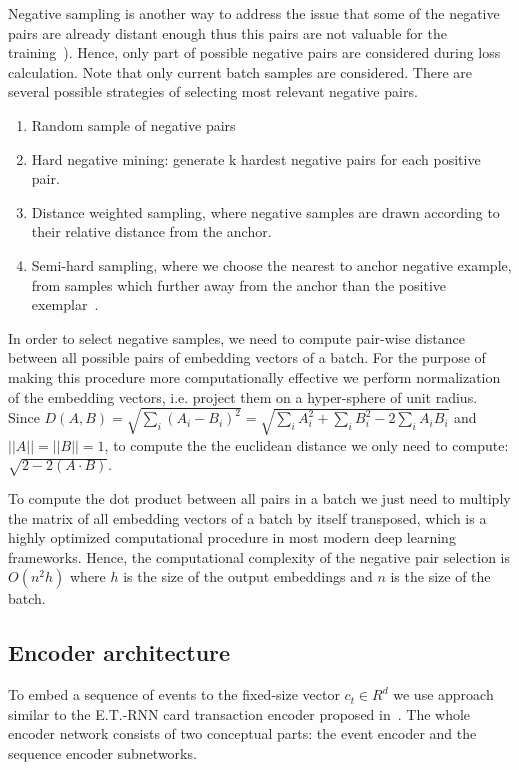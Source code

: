 \documentclass{article}
\begin{document}
Negative sampling is another way to address the issue that some of the negative pairs are already distant enough thus this pairs are not valuable for the training~\cite{SimoSerra2015DiscriminativeLO, Manmatha2017SamplingMI, Schroff2015FaceNetAU}). Hence, only part of possible negative pairs are considered during loss calculation. Note that only current batch samples are considered. There are several possible strategies of selecting most relevant negative pairs.

\begin{enumerate}
    \item Random sample of negative pairs
    \item Hard negative mining: generate k hardest negative pairs for each positive pair.
    \item Distance weighted sampling, where negative samples are drawn according to their relative distance from the anchor.~\cite{Manmatha2017SamplingMI}
    \item Semi-hard sampling, where we choose the nearest to anchor negative example, from samples which further away from the anchor than the positive exemplar~\cite{Schroff2015FaceNetAU}.
\end{enumerate}

In order to select negative samples, we need to compute pair-wise distance between all possible pairs of embedding vectors of a batch. For the purpose of making this procedure more computationally effective we perform normalization of the embedding vectors, i.e. project them on a hyper-sphere of unit radius. Since $D(A,B) = \sqrt{\sum_i(A_i - B_i)^2} = \sqrt{\sum_i A_i^2 + \sum_i B_i^2 - 2\sum_i A_i B_i} $ and $||A||= ||B||=1$, to compute the the euclidean distance we only need to compute: $\sqrt{2 - 2(A \cdot B)}$.

To compute the dot product between all pairs in a batch we just need to multiply the matrix of all embedding vectors of a batch by itself transposed, which is a highly optimized computational procedure in most modern deep learning frameworks. Hence, the computational complexity of the negative pair selection is $O(n^2h)$ where $h$ is the size of the output embeddings and $n$ is the size of the batch.

\subsection{Encoder architecture} \label{sec-enc-arch}

To embed a sequence of events to the fixed-size vector $c_t \in R^d$ we use approach similar to the E.T.-RNN card transaction encoder proposed in~\cite{Babaev2019ETRNNAD}. The whole encoder network consists of two conceptual parts: the event encoder and the sequence encoder subnetworks.
\end{document}
